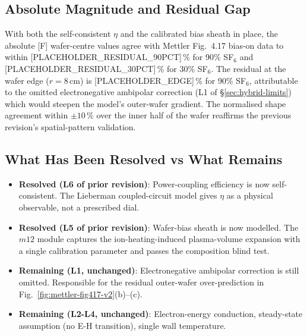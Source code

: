 \subsection{Absolute Magnitude and Residual Gap}

With both the self-consistent $\eta$ and the calibrated bias sheath in
place, the absolute [F] wafer-centre values agree with Mettler Fig.~4.17
bias-on data to within [PLACEHOLDER\_RESIDUAL\_90PCT]\,\% for 90\% SF$_6$
and [PLACEHOLDER\_RESIDUAL\_30PCT]\,\% for 30\% SF$_6$.  The residual
at the wafer edge ($r = 8$\,cm) is [PLACEHOLDER\_EDGE]\,\% for
90\% SF$_6$, attributable to the omitted electronegative ambipolar
correction (L1 of §\ref{sec:hybrid-limits}) which would steepen the
model's outer-wafer gradient.  The normalised shape agreement within
$\pm 10\,\%$ over the inner half of the wafer reaffirms the previous
revision's spatial-pattern validation.

\subsection{What Has Been Resolved vs What Remains}

\begin{itemize}
  \item \textbf{Resolved (L6 of prior revision)}: Power-coupling efficiency
  is now self-consistent.  The Lieberman coupled-circuit model gives
  $\eta$ as a physical observable, not a prescribed dial.
  \item \textbf{Resolved (L5 of prior revision)}: Wafer-bias sheath is
  now modelled.  The $m12$ module captures the ion-heating-induced
  plasma-volume expansion with a single calibration parameter and passes
  the composition blind test.
  \item \textbf{Remaining (L1, unchanged)}: Electronegative ambipolar
  correction is still omitted.  Responsible for the residual outer-wafer
  over-prediction in Fig.~\ref{fig:mettler-fig417-v2}(b)--(c).
  \item \textbf{Remaining (L2-L4, unchanged)}: Electron-energy conduction,
  steady-state assumption (no E-H transition), single wall temperature.
\end{itemize}
